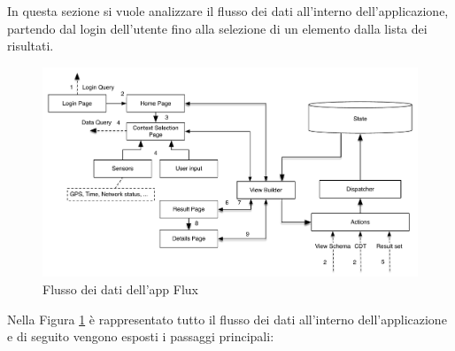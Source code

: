 In questa sezione si vuole analizzare il flusso dei dati all'interno dell'applicazione, partendo dal login dell'utente fino alla selezione di un elemento dalla lista dei risultati.
\begin{figure}[H]
	\centering
	\includegraphics[width=\textwidth]{6-implementazione-app/immagini/app_dataflow.pdf}
	\caption{Flusso dei dati dell'app Flux}\label{fig:app-dataflow}
\end{figure}
Nella Figura \ref{fig:app-dataflow} è rappresentato tutto il flusso dei dati all'interno dell'ap\-pli\-ca\-zio\-ne e di seguito vengono esposti i passaggi principali:
